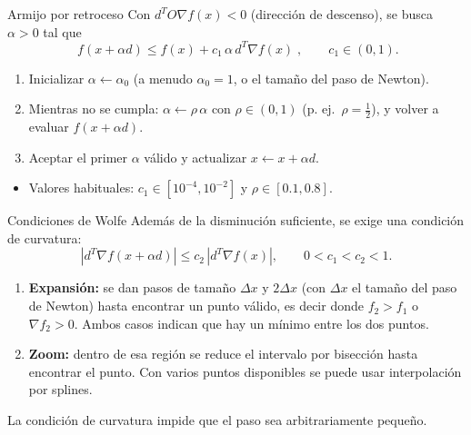 \documentclass[10pt,aspectratio=169]{beamer}
\begin{document}
\begin{frame}{Armijo por retroceso}
  \small
  Con $d^TO\nabla f(x)<0$ (dirección de descenso), se busca $\alpha>0$ tal que
  \[
    \boxed{\;f(x+\alpha d)\le f(x)+c_1\,\alpha\,d^{T}\nabla f(x)\;},
    \qquad c_1\in(0,1).
  \]
  \begin{enumerate}
    \item Inicializar $\alpha\leftarrow\alpha_0$ (a menudo $\alpha_0=1$, o el tamaño
      del paso de Newton).
    \item Mientras no se cumpla: $\alpha\leftarrow\rho\,\alpha$ con $\rho\in(0,1)$
      (p. ej.\ $\rho=\tfrac12$), y volver a evaluar $f(x+\alpha d)$.
    \item Aceptar el primer $\alpha$ válido y actualizar $x\leftarrow x+\alpha d$.
  \end{enumerate}
  \begin{itemize}
    \item Valores habituales: $c_1\in[10^{-4},10^{-2}]$ y $\rho\in[0.1,0.8]$.
  \end{itemize}
\end{frame}

\begin{frame}{Condiciones de Wolfe}
  \small
  Además de la disminución suficiente, se exige una condición de curvatura:
  \[
    |d^{T}\nabla f(x+\alpha d)|\le c_2\,|d^{T}\nabla f(x)|,
    \qquad 0<c_1<c_2<1.
  \]
  \begin{enumerate}
    \item \textbf{Expansión:} se dan pasos de tamaño $\Delta x$ y $2\Delta x$
      (con $\Delta x$ el tamaño del paso de Newton) hasta encontrar un punto
      válido, es decir donde $f_{2}>f_{1}$ o $\nabla f_{2}>0$.
      Ambos casos indican que hay un mínimo entre los dos puntos.
    \item \textbf{Zoom:} dentro de esa región se reduce el intervalo por bisección
      hasta encontrar el punto. Con varios puntos disponibles se puede usar
      interpolación por splines.
  \end{enumerate}
  \vfill
  {\scriptsize\color{gray}
    La condición de curvatura impide que el paso sea arbitrariamente pequeño.}
\end{frame}
\end{document}
